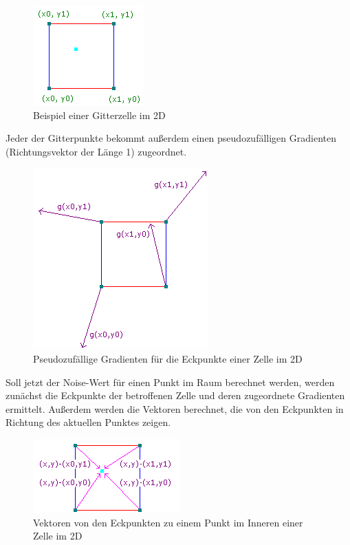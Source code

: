 \begin{figure}[h]
    \centering
    \includegraphics[height=\imgHeight]{images/noise_cell.png}
    \caption{Beispiel einer Gitterzelle im 2D}
    \label{fig:noise_cell}
\end{figure}

Jeder der Gitterpunkte bekommt außerdem einen pseudozufälligen Gradienten (Richtungsvektor der Länge 1) zugeordnet.

\begin{figure}[h]
    \centering
    \includegraphics[height=\imgHeight]{images/noise_gradient.png}
    \caption{Pseudozufällige Gradienten für die Eckpunkte einer Zelle im 2D}
    \label{fig:noise_gradient}
\end{figure}

Soll jetzt der Noise-Wert
für einen Punkt im Raum berechnet werden, werden zunächst die Eckpunkte der betroffenen Zelle und deren zugeordnete Gradienten ermittelt.
Außerdem werden die Vektoren berechnet, die von den Eckpunkten in Richtung des aktuellen Punktes zeigen.

\begin{figure}[h]
    \centering
    \includegraphics[height=\imgHeight]{images/noise_vectors.png}
    \caption{Vektoren von den Eckpunkten zu einem Punkt im Inneren einer Zelle im 2D}
    \label{fig:noise_vectors}
\end{figure}

